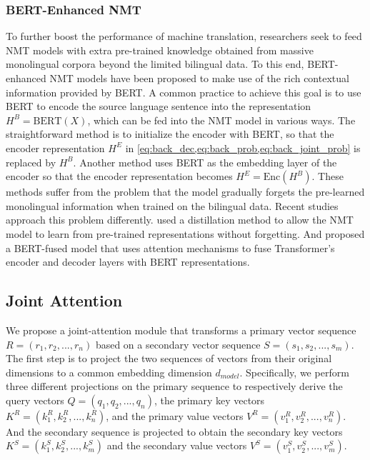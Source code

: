 \documentclass[review]{elsarticle}
\begin{document}
\subsubsection{BERT-Enhanced NMT} 
To further boost the performance of machine translation, researchers seek to feed NMT models with extra pre-trained knowledge obtained from massive monolingual corpora beyond the limited bilingual data. To this end, BERT-enhanced NMT models have been proposed to make use of the rich contextual information provided by BERT. A common practice to achieve this goal is to use BERT to encode the source language sentence into the representation $H^B=\text{BERT}(X)$, which can be fed into the NMT model in various ways. The straightforward method is to initialize the encoder with BERT, so that the encoder representation $H^E$ in \cref{eq:back_dec,eq:back_prob,eq:back_joint_prob} is replaced by $H^B$.
Another method uses BERT as the embedding layer of the encoder so that the encoder representation becomes $H^E=\text{Enc}(H^B)$. These methods suffer from the problem that the model gradually forgets the pre-learned monolingual information when trained on the bilingual data. Recent studies approach this problem differently. \citet{Yang20} used a distillation method to allow the NMT model to learn from pre-trained representations without forgetting. And \citet{Zhu20} proposed a BERT-fused model that uses attention mechanisms to fuse Transformer's encoder and decoder layers with BERT representations. 


\subsection{Joint Attention}
We propose a joint-attention module that transforms a primary vector sequence $R=(r_1, r_2, ..., r_n)$ based on a secondary vector sequence $S=(s_1, s_2, ...,\allowbreak s_m)$. The first step is to project the two sequences of vectors from their original dimensions to a common embedding dimension $d_{model}$. Specifically, we perform three different projections on the primary sequence to respectively derive the query vectors $Q=(q_1, q_2, ..., q_n)$, the primary key vectors $K^R=(k_1^R, k_2^R, ..., k_n^R)$, and the primary value vectors $V^R=(v_1^R, v_2^R, ..., v_n^R)$. And the secondary sequence is projected to obtain the secondary key vectors $K^S=(k_1^S, k_2^S, ..., k_m^S)$ and the secondary value vectors $V^S=(v_1^S, v_2^S, ..., v_m^S)$.
\end{document}
